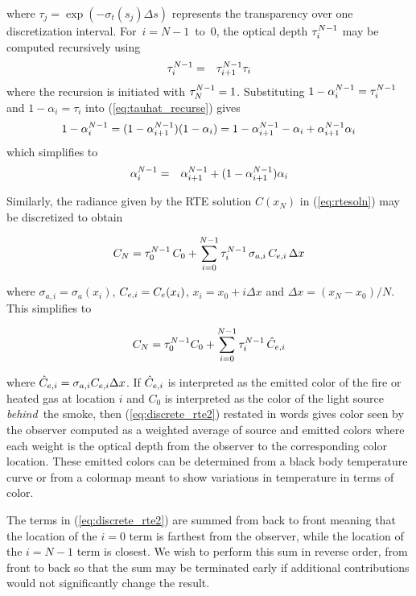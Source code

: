 \noindent where $\tau_j=\exp\left(-\sigma_t(s_j)\Delta s\right)$
represents the transparency over one discretization interval.
For~$i=N-1$~to~$0$, the optical depth $\tau_{i}^{N-1}$ may be computed
recursively using
\begin{eqnarray}
\label{eq:tauhat_recurse}
\tau_{i}^{N-1}&=&\tau_{i+1}^{N-1}\tau_i
\end{eqnarray}
\noindent where the recursion is initiated with $\tau_{N}^{N-1}=1$.
Substituting $1-\alpha_{i}^{N-1}=\tau_{i}^{N-1}$ and $1-\alpha_i=\tau_i$ into
(\ref{eq:tauhat_recurse}) gives
\begin{eqnarray}
1-\alpha_{i}^{N-1}=(1-\alpha_{i+1}^{N-1})(1-\alpha_i)=1-\alpha_{i+1}^{N-1} - \alpha_i + \alpha_{i+1}^{N-1}\alpha_i
\end{eqnarray}
which simplifies to
\begin{eqnarray}
\label{eq:alpha2}
\alpha_{i}^{N-1}&=&\alpha_{i+1}^{N-1} + (1-\alpha_{i+1}^{N-1})\alpha_i
\end{eqnarray}

Similarly, the radiance given by the RTE solution $C(x_N)$ in (\ref{eq:rtesoln}) may be discretized to obtain

\begin{eqnarray}
C_{N} = \tau_{0}^{N-1}\,C_0 +
\sum_{i=0}^{N-1}\tau_{i}^{N-1}\,\sigma_{a,i}\,C_{e,i}\,\Delta x
\end{eqnarray}

\noindent where $\sigma_{a,i}=\sigma_a(x_i)$, $C_{e,i}=C_e(x_i)$,
$x_i=x_0+i\Delta x$ and $\Delta x=(x_N-x_0)/N$. This simplifies to

\begin{equation}
\label{eq:discrete_rte2}
C_N = \tau_{0}^{N-1}C_0 + \sum_{i=0}^{N-1}\tau_{i}^{N-1}\,\hat{C}_{e,i}
\end{equation}

\noindent where $\hat{C}_{e,i}=\sigma_{a,i}C_{e,i}\Delta x$.  If
$\hat{C}_{e,i}$ is interpreted as the emitted color of the fire or
heated gas at location $i$ and $C_0$ is interpreted as the color
of the light source {\em behind}\ the smoke, then
(\ref{eq:discrete_rte2}) restated in words gives color seen by the
observer computed as a weighted average of source and emitted
colors where each weight is the optical depth from the observer to
the corresponding color location.  These emitted colors can be
determined from a black body temperature curve or from a colormap
meant to show variations in temperature in terms of color.


The terms in (\ref{eq:discrete_rte2}) are summed from back to front meaning that the location of the $i=0$ term is farthest from the observer, while the location of the $i=N-1$ term is closest.  We wish to perform this sum in reverse order, from front to back so that the sum may be terminated early if additional contributions would not significantly change the result.

